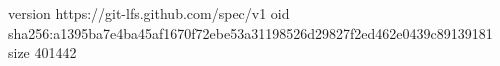version https://git-lfs.github.com/spec/v1
oid sha256:a1395ba7e4ba45af1670f72ebe53a31198526d29827f2ed462e0439c89139181
size 401442
